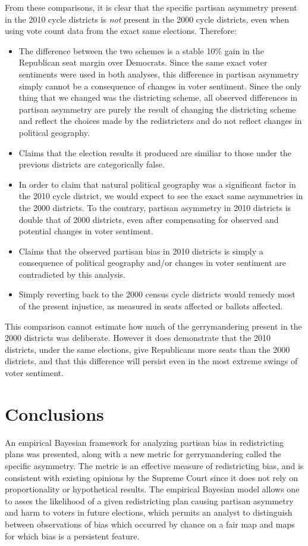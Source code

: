 \documentclass[preprint,12pt]{article}
\begin{document}
From these comparisons, it is clear that the specific partisan asymmetry present in the 2010 cycle districts is \emph{not} present in the 2000 cycle districts, even when using vote count data from the exact same elections.  Therefore:
\begin{itemize}

\item The difference between the two schemes is a stable 10\% gain in the Republican seat margin over Democrats.
Since the same exact voter sentiments were used in both analyses, this difference in partisan asymmetry simply cannot be a consequence of changes in voter sentiment.  
Since the only thing that we changed was the districting scheme, all observed differences in partisan asymmetry are purely the result of changing the districting scheme and reflect the choices made by the redistricters and do not reflect changes in political geography.
\item Claims that the election results it produced are similiar to those under the previous districts are categorically false.
\item In order to claim that natural political geography was a significant factor in the 2010 cycle district, we would expect to see the exact same asymmetries in the 2000 districts.
To the contrary, partisan asymmetry in 2010 districts is double that of 2000 districts, even after compensating for observed and potential changes in voter sentiment.
\item Claims that the observed partisan bias in 2010 districts is simply a consequence of political geography and/or changes in voter sentiment are contradicted by this analysis.
\item Simply reverting back to the 2000 census cycle districts would remedy most of the present injustice, as measured in seats affected or ballots affected.
\end{itemize}

This comparison cannot estimate how much of the gerrymandering present in the 2000 districts was deliberate.
However it does demonstrate that the 2010 districts, under the same elections, give Republicans more seats than the 2000 districts, and that this difference will persist even in the most extreme swings of voter sentiment.

\section{Conclusions}
An empirical Bayesian framework for analyzing partisan bias in redistricting plans was presented, along with a new metric for gerrymandering called the specific asymmetry.
The metric is an effective measure of redistricting bias, and is consistent with existing opinions by the Supreme Court since it does not rely on proportionality or hypothetical results.
The empirical Bayesian model allows one to asses the likelihood of a given redistricting plan causing partisan asymmetry and harm to voters in future elections, which permits an analyst to distinguish between observations of bias which occurred by chance on a fair map and maps for which bias is a persistent feature.
\end{document}
